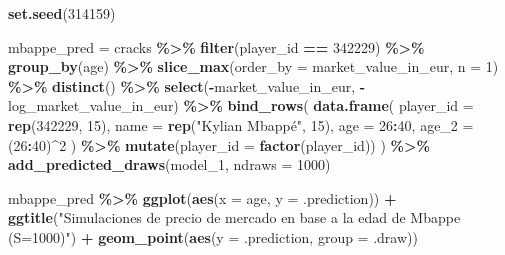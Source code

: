 \documentclass[
]{article}
\newenvironment{Shaded}{\begin{snugshade}}{\end{snugshade}}
\newcommand{\AttributeTok}[1]{\textcolor[rgb]{0.13,0.29,0.53}{#1}}
\newcommand{\DecValTok}[1]{\textcolor[rgb]{0.00,0.00,0.81}{#1}}
\newcommand{\FunctionTok}[1]{\textcolor[rgb]{0.13,0.29,0.53}{\textbf{#1}}}
\newcommand{\NormalTok}[1]{#1}
\newcommand{\OtherTok}[1]{\textcolor[rgb]{0.56,0.35,0.01}{#1}}
\newcommand{\SpecialCharTok}[1]{\textcolor[rgb]{0.81,0.36,0.00}{\textbf{#1}}}
\newcommand{\StringTok}[1]{\textcolor[rgb]{0.31,0.60,0.02}{#1}}
\begin{document}
\begin{Shaded}
\begin{Highlighting}[]
\FunctionTok{set.seed}\NormalTok{(}\DecValTok{314159}\NormalTok{)}

\NormalTok{mbappe\_pred }\OtherTok{=}\NormalTok{ cracks }\SpecialCharTok{\%\textgreater{}\%}
    \FunctionTok{filter}\NormalTok{(player\_id }\SpecialCharTok{==} \DecValTok{342229}\NormalTok{) }\SpecialCharTok{\%\textgreater{}\%}
    \FunctionTok{group\_by}\NormalTok{(age) }\SpecialCharTok{\%\textgreater{}\%}
    \FunctionTok{slice\_max}\NormalTok{(}\AttributeTok{order\_by =}\NormalTok{ market\_value\_in\_eur, }\AttributeTok{n =} \DecValTok{1}\NormalTok{) }\SpecialCharTok{\%\textgreater{}\%}
    \FunctionTok{distinct}\NormalTok{() }\SpecialCharTok{\%\textgreater{}\%}
    \FunctionTok{select}\NormalTok{(}\SpecialCharTok{{-}}\NormalTok{market\_value\_in\_eur, }\SpecialCharTok{{-}}\NormalTok{log\_market\_value\_in\_eur) }\SpecialCharTok{\%\textgreater{}\%}
    \FunctionTok{bind\_rows}\NormalTok{(}
        \FunctionTok{data.frame}\NormalTok{(}
          \AttributeTok{player\_id =} \FunctionTok{rep}\NormalTok{(}\DecValTok{342229}\NormalTok{, }\DecValTok{15}\NormalTok{),}
          \AttributeTok{name =} \FunctionTok{rep}\NormalTok{(}\StringTok{"Kylian Mbappé"}\NormalTok{, }\DecValTok{15}\NormalTok{),}
          \AttributeTok{age =} \DecValTok{26}\SpecialCharTok{:}\DecValTok{40}\NormalTok{,}
          \AttributeTok{age\_2 =}\NormalTok{ (}\DecValTok{26}\SpecialCharTok{:}\DecValTok{40}\NormalTok{)}\SpecialCharTok{\^{}}\DecValTok{2}
\NormalTok{        ) }\SpecialCharTok{\%\textgreater{}\%}
      \FunctionTok{mutate}\NormalTok{(}\AttributeTok{player\_id =} \FunctionTok{factor}\NormalTok{(player\_id))}
\NormalTok{    ) }\SpecialCharTok{\%\textgreater{}\%}
  \FunctionTok{add\_predicted\_draws}\NormalTok{(model\_1, }\AttributeTok{ndraws =} \DecValTok{1000}\NormalTok{)}

\NormalTok{mbappe\_pred }\SpecialCharTok{\%\textgreater{}\%}
  \FunctionTok{ggplot}\NormalTok{(}\FunctionTok{aes}\NormalTok{(}\AttributeTok{x =}\NormalTok{ age, }\AttributeTok{y =}\NormalTok{ .prediction)) }\SpecialCharTok{+}
  \FunctionTok{ggtitle}\NormalTok{(}\StringTok{"Simulaciones de precio de mercado en base a la edad de Mbappe (S=1000)"}\NormalTok{) }\SpecialCharTok{+}
  \FunctionTok{geom\_point}\NormalTok{(}\FunctionTok{aes}\NormalTok{(}\AttributeTok{y =}\NormalTok{ .prediction, }\AttributeTok{group =}\NormalTok{ .draw))}
\end{Highlighting}
\end{Shaded}
\end{document}
